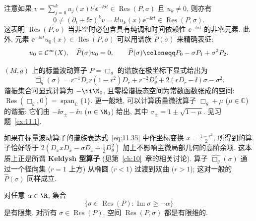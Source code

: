 注意如果 $v = \sum_{j=0}^k u_j(x) t^j \ee^{-\ii \sigma t} \in \operatorname{Res}(P, \sigma)$ 且 $u_k \neq 0$, 则亦有
\[
    0 \neq (\partial_t + \ii \sigma)^k v = k! u_k(x) \ee^{-\ii \sigma t} \in \operatorname{Res}(P, \sigma).
\]
这表明 $\operatorname{Res}(P, \sigma)$ 当非空时必包含具有纯调和时间依赖性 $\ee^{-\ii \sigma t}$ 的非零元素. 此外, 元素 $\ee^{-\ii \sigma t} u_0(x) \in \operatorname{Res}(P, \sigma)$ 可以用谱族 $\widehat{P}(\sigma)$ 来精确表征:
\begin{equation}\label{eq:11.34}
    u_0 \in \mathcal{C}^\infty(X), \quad \widehat{P}(\sigma) u_0 = 0, \qquad \widehat{P}(\sigma) \defeq P_0 - \sigma P_1 + \sigma^2 P_2.
\end{equation}

\begin{example}[标量波动算子的谐振]\label{eg:11.8}
$(M, g)$ 上的标量波动算子 $P = \Box_g$ 的谱族在极坐标下显式给出为
\begin{equation}\label{eq:11.35}
    \widehat{\Box_g}(\sigma) = r^{-1} D_r r(1 - r^2) D_r + r^{-2} D_\theta^2 + 2(r D_r - \ii)\sigma - \sigma^2.
\end{equation}
谐振集合可显式计算为 $-\ii \N_0$, 且零模谐振态空间为常数函数张成的空间: $\operatorname{Res}(\Box_g, 0) = \operatorname{span}_{\mathbb{C}}\{1\}$. 更一般地, 可以计算质量微扰算子 $\Box_g + \mu$ ($\mu \in \mathbb{C}$) 的谐振: 它们由 $-\ii \sigma_\pm - \ii n$ ($n \in \N_0$) 给出, 其中 $\sigma_\pm = 1 \pm \sqrt{1 - \mu}$. 见习题~\ref{ex:11.1}.
\end{example}

\begin{remark}\label{rem:11.9}
如果在标量波动算子的谱族表达式~\eqref{eq:11.35} 中作坐标变换 $x = \frac{1 - r^2}{2}$, 所得到的算子恰好等于 $2(D_x x D_x - \sigma D_x + \frac{1}{2} D_\theta^2)$ 加上不影响主微局部几何的高阶余项. 这本质上正是所谓 \textbf{Keldysh 型算子} (见第~\ref{ch:10}~章的相关讨论). 算子 $\widehat{\Box_g}(\sigma)$ 通过一个径向集 ($r = 1$ 上方) 从椭圆 ($r < 1$) 过渡到双曲 ($r > 1$); 这对一般的 $\widehat{P}(\sigma)$ 同样成立.
\end{remark}

\begin{theorem}[谐振的离散与有限性]\label{thm:11.10}
对任意 $\alpha \in \R$, 集合
\[
    \{\sigma \in \operatorname{Res}(P) : \operatorname{Im}\sigma \ge -\alpha\}
\]
是有限集. 对所有 $\sigma \in \operatorname{Res}(P)$, 空间 $\operatorname{Res}(P, \sigma)$ 都是有限维的.
\end{theorem}


